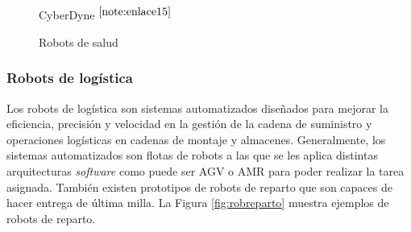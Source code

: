 \begin{figure}[ht!]
\begin{minipage}{0.25\linewidth}
    	\caption*{\centering CyberDyne $^{\ref{note:enlace15}}$}
    \end{minipage}
	\caption{Robots de salud}
	\label{fig:robsalud}
\end{figure}


\setcounter{footnote}{12} %

\setcounter{footnote}{13} %

\setcounter{footnote}{14} %

\setcounter{footnote}{15} %

\subsubsection{Robots de logística}
\label{subsubsec:robotlogistica}

Los robots de logística son sistemas automatizados diseñados para mejorar la eficiencia, precisión y velocidad en la gestión de la cadena de suministro y operaciones logísticas en cadenas de montaje y almacenes. Generalmente, los sistemas automatizados son flotas de robots a las que se les aplica distintas arquitecturas \textit{software} como puede ser \acs{AGV} o \acs{AMR} para poder realizar la tarea asignada. También existen prototipos de robots de reparto que son capaces de hacer entrega de última milla. La Figura \ref{fig:robreparto}  muestra ejemplos de robots de reparto. 

